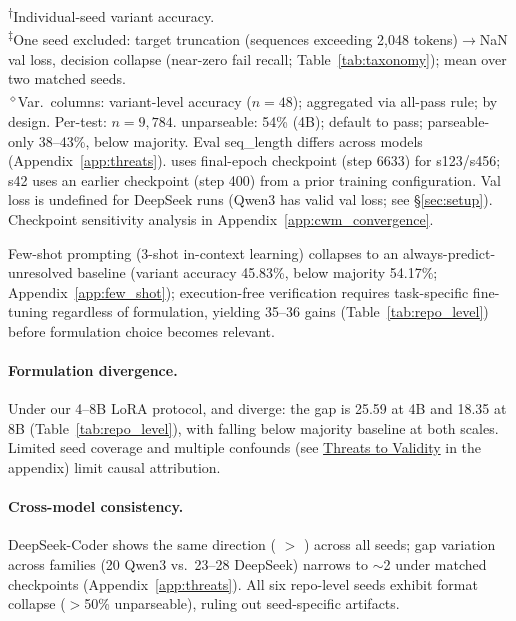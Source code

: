 \begin{table}[t]
\vspace{2pt}
{\footnotesize
\textsuperscript{$\dagger$}Individual-seed variant accuracy.\\
\textsuperscript{$\ddagger$}One seed excluded: target truncation (sequences exceeding 2,048 tokens)$\to$NaN val loss, decision collapse (near-zero fail recall; Table~\ref{tab:taxonomy}); mean over two matched seeds.\\
\textsuperscript{$\diamond$}Var.\ columns: variant-level accuracy ($n{=}48$); \cls{} aggregated via all-pass rule; \traj{} by design. Per-test: $n{=}9{,}784$. \cwm{} unparseable: 54\% (4B); default to pass; parseable-only 38--43\%, below majority. Eval seq\_length differs across models (Appendix~\ref{app:threats}). \cwm{} uses final-epoch checkpoint (step 6633) for s123/s456; s42 uses an earlier checkpoint (step 400) from a prior training configuration. Val loss is undefined for DeepSeek \cwm{} runs (Qwen3 \cwm{} has valid val loss; see \S\ref{sec:setup}). Checkpoint sensitivity analysis in Appendix~\ref{app:cwm_convergence}.}
\end{table}

Few-shot prompting (3-shot in-context learning) collapses to an always-predict-unresolved baseline (variant accuracy 45.83\%, below majority 54.17\%; Appendix~\ref{app:few_shot}); execution-free verification requires task-specific fine-tuning regardless of formulation, yielding 35--36\pp{} gains (Table~\ref{tab:repo_level}) before formulation choice becomes relevant.

\paragraph{Formulation divergence.} Under our 4--8B LoRA protocol, \cls{} and \cwm{} diverge: the gap is 25.59\pp{} at 4B and 18.35\pp{} at 8B (Table~\ref{tab:repo_level}), with \cwm{} falling below majority baseline at both scales. Limited seed coverage and multiple confounds (see \hyperref[sec:threats]{Threats to Validity} in the appendix) limit causal attribution.

\paragraph{Cross-model consistency.} DeepSeek-Coder shows the same direction (\cls{} $>$ \cwm{}) across all seeds; gap variation across families (20\pp{} Qwen3 vs.\ 23--28\pp{} DeepSeek) narrows to ${\sim}$2\pp{} under matched checkpoints (Appendix~\ref{app:threats}). All six \cwm{} repo-level seeds exhibit format collapse ($>$50\% unparseable), ruling out seed-specific artifacts.

